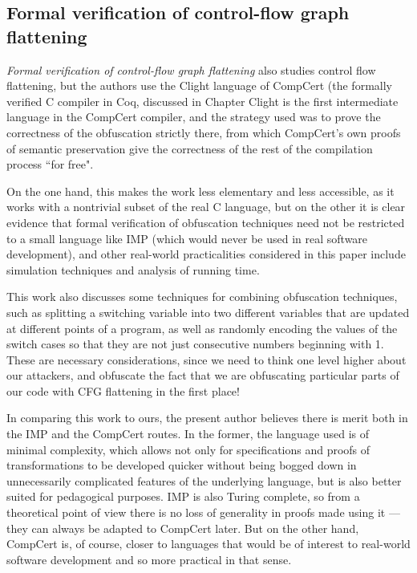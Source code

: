 \documentclass[compsoc,conference,a4paper,10pt,times]{IEEEtran}
\begin{document}
\subsection*{Formal verification of control-flow graph flattening}
\par \emph{Formal verification of control-flow graph flattening} \cite{Blazy2} also studies control flow flattening, but the authors use the Clight language of CompCert (the formally verified C compiler in Coq, discussed in Chapter %
Clight is the first intermediate language in the CompCert compiler, and the strategy used was to prove the correctness of the obfuscation strictly there, from which CompCert's own proofs of semantic preservation give the correctness of the rest of the compilation process ``for free".
\par On the one hand, this makes the work less elementary and less accessible, as it works with a nontrivial subset of the real C language, but on the other it is clear evidence that formal verification of obfuscation techniques need not be restricted to a small language like IMP (which would never be used in real software development), and other real-world practicalities considered in this paper include simulation techniques and analysis of running time.
\par This work also discusses some techniques for combining obfuscation techniques, such as splitting a switching variable into two different variables that are updated at different points of a program, as well as randomly encoding the values of the switch cases so that they are not just consecutive numbers beginning with 1.  These are necessary considerations, since we need to think one level higher about our attackers, and obfuscate the fact that we are obfuscating particular parts of our code with CFG flattening in the first place!
\par In comparing this work to ours, the present author believes there is merit both in the IMP and the CompCert routes.  In the former, the language used is of minimal complexity, which allows not only for specifications and proofs of transformations to be developed quicker without being bogged down in unnecessarily complicated features of the underlying language, but is also better suited for pedagogical purposes.  IMP is also Turing complete, so from a theoretical point of view there is no loss of generality in proofs made using it --- they can always be adapted to CompCert later.  But on the other hand, CompCert is, of course, closer to languages that would be of interest to real-world software development and so more practical in that sense.
\end{document}
